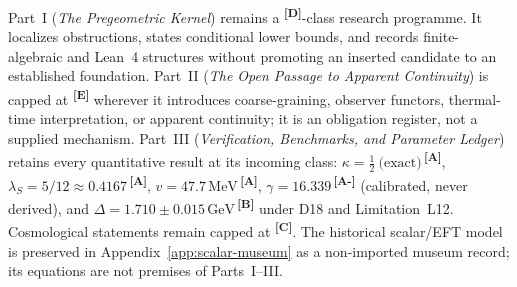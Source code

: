 \documentclass[12pt,a4paper,twoside]{article}
\theoremstyle{plain}
\theoremstyle{definition}
\theoremstyle{remark}
\newcommand{\GeV}{\,\mathrm{GeV}}
\newcommand{\MeV}{\,\mathrm{MeV}}
\newcommand{\catmark}[1]{\textsuperscript{\textsf{\textbf{[#1]}}}}
\newcommand{\lambdaS}{5/12 \approx 0.4167} %
\newcommand{\DeltaGap}{1.710 \pm 0.015\GeV} %
\newcommand{\GammaGeom}{16.339} %
\newcommand{\vVEV}{47.7\MeV} %
\newcommand{\KappaRG}{\tfrac{1}{2}\ \text{(exact)}} %
\begin{document}
\begin{evidencebox}{}
Part~I (\emph{The Pregeometric Kernel}) remains a \catmark{D}-class research
programme. It localizes obstructions, states conditional lower bounds, and
records finite-algebraic and Lean~4 structures without promoting an inserted
candidate to an established foundation. Part~II (\emph{The Open Passage to
Apparent Continuity}) is capped at \catmark{E} wherever it introduces
coarse-graining, observer functors, thermal-time interpretation, or apparent
continuity; it is an obligation register, not a supplied mechanism. Part~III
(\emph{Verification, Benchmarks, and Parameter Ledger}) retains every
quantitative result at its incoming class: $\kappa=\KappaRG$\,\catmark{A},
$\lambda_S=\lambdaS$\,\catmark{A}, $v=\vVEV$\,\catmark{A},
$\gamma=\GammaGeom$\,\catmark{A-} (calibrated, never derived), and
$\Delta=\DeltaGap$\,\catmark{B} under D18 and Limitation~L12. Cosmological
statements remain capped at \catmark{C}. The historical scalar/EFT model is
preserved in Appendix~\ref{app:scalar-museum} as a non-imported museum record;
its equations are not premises of Parts~I--III.
\end{evidencebox}

\newpage
\tableofcontents
\newpage
\end{document}
